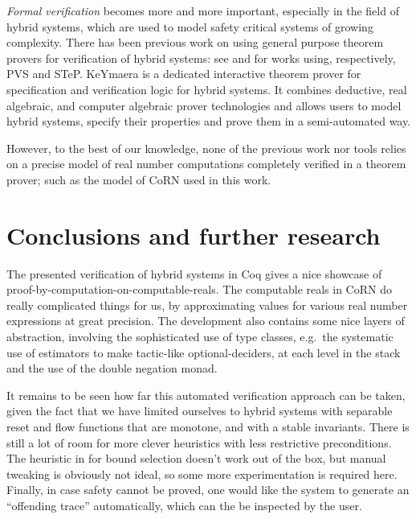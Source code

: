\documentclass[runningheads]{llncs}
\begin{document}
\emph{Formal verification} becomes more and more important, especially in the
field of hybrid systems, which are used to model safety critical systems 
of growing complexity. There has been previous work on using general purpose 
theorem provers for verification of hybrid systems: see \cite{Mum01,Hen98} 
and \cite{Man98,Man01} for works using, respectively, PVS and STeP. 
KeYmaera \cite{KeYmaera} is a dedicated interactive theorem prover for 
specification and verification logic for hybrid systems. It combines
deductive, real algebraic, and computer algebraic prover technologies
and allows users to model hybrid systems, specify their properties
and prove them in a semi-automated way.

However, to the best of our knowledge, none of the previous work nor tools 
relies on a precise model of real number computations completely verified 
in a theorem prover; such as the model of CoRN used in this work.

\section{Conclusions and further research}
The presented verification of hybrid systems in Coq gives a nice
showcase of proof-by-computation-on-computable-reals. The computable
reals in CoRN do really complicated things for us, by approximating
values for various real number expressions at great precision. The
development also contains some nice layers of abstraction, involving
the sophisticated use of type classes, e.g.\ the systematic use of
estimators to make tactic-like optional-deciders, at each level in the
stack and the use of the double negation monad.

It remains to be seen how far this automated verification approach can be
taken, given the fact that we have limited ourselves to hybrid systems
with separable reset and flow functions that are monotone, and with a
stable invariants. There is still a lot of room for more clever
heuristics with less restrictive preconditions. The heuristic in
\cite{alur} for bound selection doesn't work out of the box, but
manual tweaking is obviously not ideal, so some more experimentation
is required here. Finally, in case safety cannot be proved, one would
like the system to generate an ``offending trace'' automatically,
which can the be inspected by the user.

%


\end{document}
